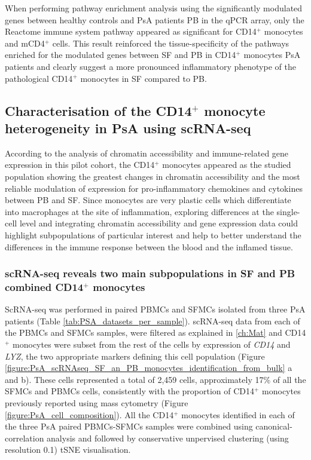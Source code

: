 When performing pathway enrichment analysis using the significantly modulated genes between healthy controls and PsA patients PB in the qPCR array, only the Reactome immune system pathway appeared as significant for CD14$^+$ monocytes and mCD4$^+$ cells. This result reinforced the tissue-specificity of the pathways enriched for the modulated genes between SF and PB in CD14$^+$ monocytes PsA patients and clearly suggest a more pronounced inflammatory phenotype of the pathological CD14$^+$ monocytes in SF compared to PB.



\subsection{Characterisation of the CD14$^+$ monocyte heterogeneity in PsA using scRNA-seq}
According to the analysis of chromatin accessibility and immune-related gene expression in this pilot cohort, the CD14$^+$ monocytes appeared as the studied population showing the greatest changes in chromatin accessibility and the most reliable modulation of expression for pro-inflammatory chemokines and cytokines between PB and SF. Since monocytes are very plastic cells which differentiate into macrophages at the site of inflammation, exploring differences at the single-cell level and integrating chromatin accessibility and gene expression data could highlight subpopulations of particular interest and help to better understand the differences in the immune response between the blood and the inflamed tissue.


\subsubsection{scRNA-seq reveals two main subpopulations in SF and PB combined CD14$^+$ monocytes}
ScRNA-seq was performed in paired PBMCs and SFMCs isolated from three PsA patients (Table \ref{tab:PSA_datasets_per_sample}). scRNA-seq data from each of the PBMCs and SFMCs samples, were filtered as explained in \ref{ch:Mat} and CD14$^+$ monocytes were subset from the rest of the cells by expression of \textit{CD14} and \textit{LYZ}, the two appropriate markers defining this cell population (Figure \ref{figure:PsA_scRNAseq_SF_an_PB_monocytes_identification_from_bulk} a and b). These cells represented a total of 2,459 cells, approximately 17\% of all the SFMCs and PBMCs cells, consistently with the proportion of CD14$^+$ monocytes previously reported using mass cytometry (Figure \ref{figure:PsA_cell_composition}). All the CD14$^+$ monocytes identified in each of the three PsA paired PBMCs-SFMCs samples were combined using canonical-correlation analysis and followed by conservative unpervised clustering (using resolution 0.1) tSNE visualisation. 


